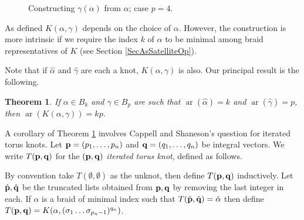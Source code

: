 \documentclass[11pt]{amsart}
\def\s{{\sigma}}
\def\ar{\operatorname{ar}}
\newcommand*{\smallp}[1]{\scalebox{.75}{\ensuremath#1}}
\newcommand{\pp}[2][p]{\imath_{\hspace*{-1pt}#1}\hspace*{-.5pt}\smallp(#2\smallp)}
\newtheorem{thm}{Theorem}[section]
\theoremstyle{definition}
\begin{document}
\begin{figure}[ht]
  \caption{Constructing $\gamma(\alpha)$ from $\alpha$; case $p=4$.}
  \label{FigBraidSat}
  \end{figure}

As defined $K(\alpha,\gamma)$ depends on the choice of $\alpha$. However, the construction is more intrinsic if we require the index $k$ of $\alpha$ to be minimal among braid representatives of $K$ (see Section \ref{SecAsSatelliteOp}). 

Note that if $\hat{\alpha}$ and $\hat{\gamma}$ are each a knot, $K(\alpha,\gamma)$ is also. Our principal result is the following.

\begin{thm}\label{main}
If $\alpha\in B_k$ and $\gamma\in B_p$ are such that $\ar(\hat{\alpha})=k$ and $\ar(\hat{\gamma})=p$, then $\ar(K(\alpha,\gamma))=kp$.
\end{thm}

A corollary of Theorem \ref{main} involves Cappell and Shaneson's question for iterated torus knots. Let ${\bf p}=(p_1,\ldots,p_n)$ and ${\bf q}=(q_1,\ldots,q_n)$ be integral vectors. We write $T({\bf p},{\bf q})$ for the $({\bf p},{\bf q})$ \emph{iterated torus knot}, defined as follows. 

By convention take $T(\emptyset,\emptyset)$ as the unknot, then define $T({\bf p},{\bf q})$ inductively. Let $\hat{\bf p}, \hat{\bf q}$ be the truncated lists obtained from ${\bf p},{\bf q}$ by removing the last integer in each. If $\alpha$ is a braid of minimal index such that $T(\hat{\bf p},\hat{\bf q}) = \hat{\alpha}$ then define $T({\bf p},{\bf q}) = K(\alpha,(\s_1\ldots\s_{p_n-1})^{q_n})$. 
\end{document}
